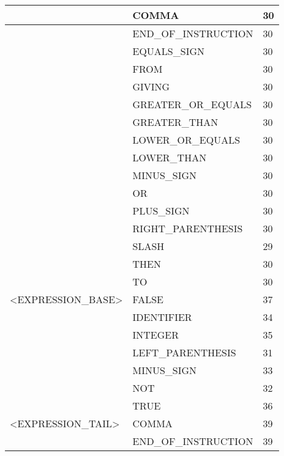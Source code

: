 \begin{longtable}{|l|l|l|}
                     &   COMMA                &   30 \\ \hline
                     &   END\_OF\_INSTRUCTION &   30 \\ \hline
                     &   EQUALS\_SIGN         &   30 \\ \hline
                     &   FROM                 &   30 \\ \hline
                     &   GIVING               &   30 \\ \hline
                     &   GREATER\_OR\_EQUALS  &   30 \\ \hline
                     &   GREATER\_THAN        &   30 \\ \hline
                     &   LOWER\_OR\_EQUALS    &   30 \\ \hline
                     &   LOWER\_THAN          &   30 \\ \hline
                     &   MINUS\_SIGN          &   30 \\ \hline
                     &   OR                   &   30 \\ \hline
                     &   PLUS\_SIGN           &   30 \\ \hline
                     &   RIGHT\_PARENTHESIS   &   30 \\ \hline
                     &   SLASH                &   29 \\ \hline
                     &   THEN                 &   30 \\ \hline
                     &   TO                   &   30 \\ \hline
<EXPRESSION\_BASE>                       &   FALSE                &   37 \\ \hline
                     &   IDENTIFIER           &   34 \\ \hline
                     &   INTEGER              &   35 \\ \hline
                     &   LEFT\_PARENTHESIS    &   31 \\ \hline
                     &   MINUS\_SIGN          &   33 \\ \hline
                     &   NOT                  &   32 \\ \hline
                     &   TRUE                 &   36 \\ \hline
<EXPRESSION\_TAIL>                       &   COMMA                &   39 \\ \hline
                     &   END\_OF\_INSTRUCTION &   39 \\ \hline

\end{longtable}

